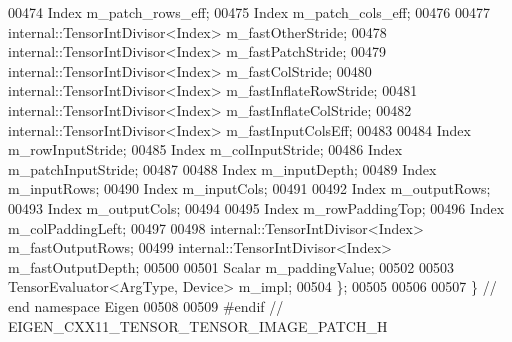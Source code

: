 \begin{DoxyCode}
00474   Index m\_patch\_rows\_eff;
00475   Index m\_patch\_cols\_eff;
00476 
00477   internal::TensorIntDivisor<Index> m\_fastOtherStride;
00478   internal::TensorIntDivisor<Index> m\_fastPatchStride;
00479   internal::TensorIntDivisor<Index> m\_fastColStride;
00480   internal::TensorIntDivisor<Index> m\_fastInflateRowStride;
00481   internal::TensorIntDivisor<Index> m\_fastInflateColStride;
00482   internal::TensorIntDivisor<Index> m\_fastInputColsEff;
00483 
00484   Index m\_rowInputStride;
00485   Index m\_colInputStride;
00486   Index m\_patchInputStride;
00487 
00488   Index m\_inputDepth;
00489   Index m\_inputRows;
00490   Index m\_inputCols;
00491 
00492   Index m\_outputRows;
00493   Index m\_outputCols;
00494 
00495   Index m\_rowPaddingTop;
00496   Index m\_colPaddingLeft;
00497 
00498   internal::TensorIntDivisor<Index> m\_fastOutputRows;
00499   internal::TensorIntDivisor<Index> m\_fastOutputDepth;
00500 
00501   Scalar m\_paddingValue;
00502 
00503   TensorEvaluator<ArgType, Device> m\_impl;
00504 \};
00505 
00506 
00507 \} \textcolor{comment}{// end namespace Eigen}
00508 
00509 \textcolor{preprocessor}{#endif // EIGEN\_CXX11\_TENSOR\_TENSOR\_IMAGE\_PATCH\_H}
\end{DoxyCode}
